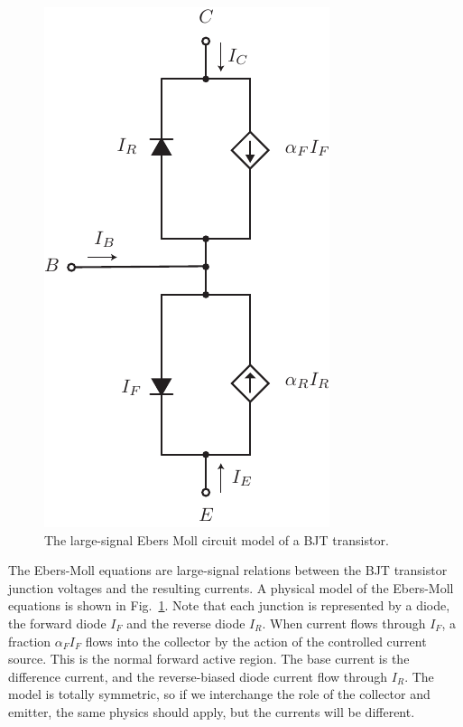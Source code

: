 \begin{figure}[tb]
\begin{center}
\includegraphics[scale=.7]{slide17_ebers_moll}
\end{center}
\caption{The large-signal Ebers Moll circuit model of a BJT transistor.} \label{fig:slide17_ebers_moll}
\end{figure}

The Ebers-Moll equations are large-signal relations between the BJT transistor junction voltages and the resulting currents.  A physical model of the Ebers-Moll equations is shown in Fig.~\ref{fig:slide17_ebers_moll}.  Note that each junction is represented by a diode, the forward diode $I_F$ and the reverse diode $I_R$.  When current flows through $I_F$, a fraction $\alpha_F I_F$ flows into the collector by the action of the controlled current source.  This is the normal forward active region. The base current is the difference current, and the reverse-biased diode current flow through $I_R$.  The model is totally symmetric, so if we interchange the role of the collector and emitter, the same physics should apply, but the currents will be different.  
 




